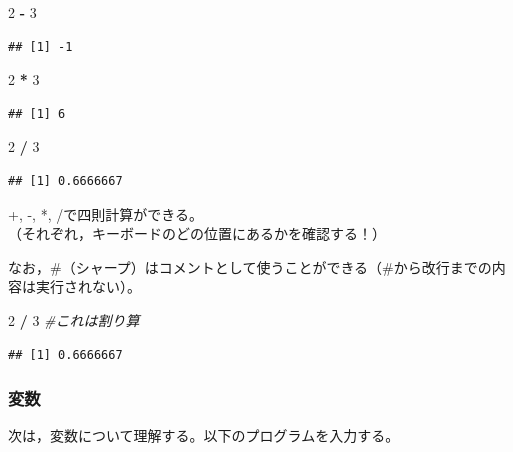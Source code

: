 \documentclass[]{article}
\newenvironment{Shaded}{\begin{snugshade}}{\end{snugshade}}
\newcommand{\DecValTok}[1]{\textcolor[rgb]{0.00,0.00,0.81}{#1}}
\newcommand{\StringTok}[1]{\textcolor[rgb]{0.31,0.60,0.02}{#1}}
\newcommand{\CommentTok}[1]{\textcolor[rgb]{0.56,0.35,0.01}{\textit{#1}}}
\newcommand{\OperatorTok}[1]{\textcolor[rgb]{0.81,0.36,0.00}{\textbf{#1}}}
\begin{document}
\begin{Shaded}
\begin{Highlighting}[]
\DecValTok{2} \OperatorTok{-}\StringTok{ }\DecValTok{3}
\end{Highlighting}
\end{Shaded}

\begin{verbatim}
## [1] -1
\end{verbatim}

\begin{Shaded}
\begin{Highlighting}[]
\DecValTok{2} \OperatorTok{*}\StringTok{ }\DecValTok{3}
\end{Highlighting}
\end{Shaded}

\begin{verbatim}
## [1] 6
\end{verbatim}

\begin{Shaded}
\begin{Highlighting}[]
\DecValTok{2} \OperatorTok{/}\StringTok{ }\DecValTok{3}
\end{Highlighting}
\end{Shaded}

\begin{verbatim}
## [1] 0.6666667
\end{verbatim}

+, -, *, /で四則計算ができる。\\
（それぞれ，キーボードのどの位置にあるかを確認する！）

なお，\#（シャープ）はコメントとして使うことができる（\#から改行までの内容は実行されない）。

\begin{Shaded}
\begin{Highlighting}[]
\DecValTok{2} \OperatorTok{/}\StringTok{ }\DecValTok{3} \CommentTok{#これは割り算}
\end{Highlighting}
\end{Shaded}

\begin{verbatim}
## [1] 0.6666667
\end{verbatim}

\subsubsection{変数}

次は，変数について理解する。以下のプログラムを入力する。
\end{document}
